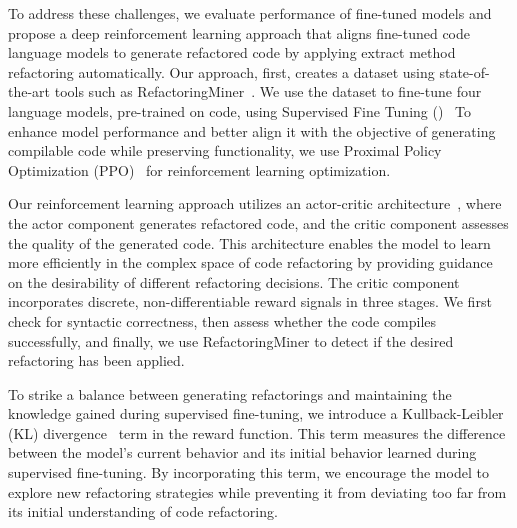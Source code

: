 To address these challenges, we evaluate performance of fine-tuned models and
propose a deep reinforcement learning approach that aligns fine-tuned code language models to generate refactored code by applying extract method refactoring automatically. 
Our approach, first, creates a dataset using state-of-the-art tools such as RefactoringMiner~\cite{Tsantalis:ICSE:2018:RefactoringMiner, Tsantalis:TSE:2020:RefactoringMiner2.0}.
We use the dataset to fine-tune four language models, pre-trained on code, using Supervised Fine Tuning (\sft{})~\cite{howard2018universal, kenton2019bert}
To enhance model performance and better align it with the objective of generating compilable code while preserving functionality, we use Proximal Policy Optimization (PPO)~\cite{schulman2017proximal} for reinforcement learning optimization.

Our reinforcement learning approach utilizes an actor-critic architecture~\cite{konda1999actor, wan2018improving}, where the actor component generates refactored code, and the critic component assesses the quality of the generated code. This architecture enables the model to learn more efficiently in the complex space of code refactoring by providing guidance on the desirability of different refactoring decisions.
The critic component incorporates discrete, non-differentiable reward signals in three stages. We first check for syntactic correctness, then assess whether the code compiles successfully, and finally, we use RefactoringMiner to detect if the desired refactoring has been applied.

To strike a balance between generating refactorings and maintaining the knowledge gained during supervised fine-tuning, we introduce a Kullback-Leibler (KL) divergence~\cite{kullback1997information, shojaee2023execution} term in the reward function. This term measures the difference between the model's current behavior and its initial behavior learned during supervised fine-tuning. By incorporating this term, we encourage the model to explore new refactoring strategies while preventing it from deviating too far from its initial understanding of code refactoring. 

